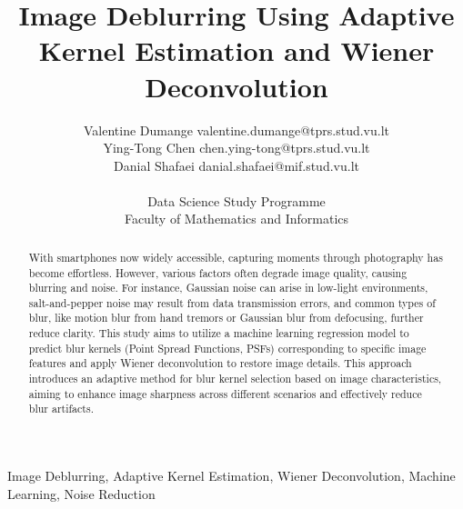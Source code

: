 \documentclass[twoside,11pt]{article}
\begin{document}
\title{Image Deblurring Using Adaptive Kernel Estimation and Wiener Deconvolution}

\author{\name Valentine Dumange \email valentine.dumange@tprs.stud.vu.lt \\
\AND
    \name Ying-Tong Chen \email chen.ying-tong@tprs.stud.vu.lt \\
\AND
    \name Danial Shafaei \email danial.shafaei@mif.stud.vu.lt \\\\
       \addr Data Science Study Programme\\
       Faculty of Mathematics and Informatics}


\maketitle

\begin{abstract}
With smartphones now widely accessible, capturing moments through photography has become effortless. However, various factors often degrade image quality, causing blurring and noise. For instance, Gaussian noise can arise in low-light environments, salt-and-pepper noise may result from data transmission errors, and common types of blur, like motion blur from hand tremors or Gaussian blur from defocusing, further reduce clarity. This study aims to utilize a machine learning regression model to predict blur kernels (Point Spread Functions, PSFs) corresponding to specific image features and apply Wiener deconvolution to restore image details. This approach introduces an adaptive method for blur kernel selection based on image characteristics, aiming to enhance image sharpness across different scenarios and effectively reduce blur artifacts.\\
\end{abstract}
\begin{keywords}
  Image Deblurring, Adaptive Kernel Estimation, Wiener Deconvolution, Machine Learning, Noise Reduction
\end{keywords}
\end{document}
